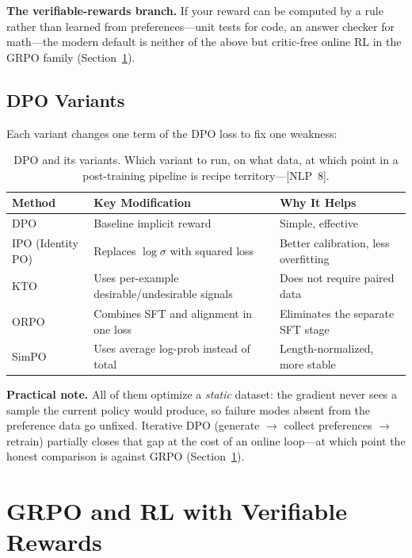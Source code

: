 \textbf{The verifiable-rewards branch.} If your reward can be computed by a rule rather than learned from preferences---unit tests for code, an answer checker for math---the modern default is neither of the above but critic-free online RL in the GRPO family (Section~\ref{sec:grpo_rlvr}).

\subsection{DPO Variants}

Each variant changes one term of the DPO loss to fix one weakness:

\begin{table}[H]
\centering
\caption{DPO and its variants. Which variant to run, on what data, at which point in a post-training pipeline is recipe territory---[NLP~8].}
\begin{tabularx}{\textwidth}{lXX}
\toprule
\textbf{Method} & \textbf{Key Modification} & \textbf{Why It Helps} \\
\midrule
DPO & Baseline implicit reward & Simple, effective \\
IPO (Identity PO) & Replaces $\log\sigma$ with squared loss & Better calibration, less overfitting \\
KTO & Uses per-example desirable/undesirable signals & Does not require paired data \\
ORPO & Combines SFT and alignment in one loss & Eliminates the separate SFT stage \\
SimPO & Uses average log-prob instead of total & Length-normalized, more stable \\
\bottomrule
\end{tabularx}
\end{table}

\textbf{Practical note.} All of them optimize a \textit{static} dataset: the gradient never sees a sample the current policy would produce, so failure modes absent from the preference data go unfixed. Iterative DPO (generate $\rightarrow$ collect preferences $\rightarrow$ retrain) partially closes that gap at the cost of an online loop---at which point the honest comparison is against GRPO (Section~\ref{sec:grpo_rlvr}).

\section{GRPO and RL with Verifiable Rewards}
\label{sec:grpo_rlvr}

